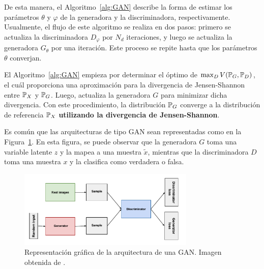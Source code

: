 {{De esta manera, el Algoritmo~\ref*{alg:GAN} describe la forma de estimar los parámetros $\theta$ y $\varphi$ de la generadora y la discriminadora, respectivamente. Usualmente, el flujo de este algoritmo se realiza en dos pasos: primero se actualiza la discriminadora $D_\varphi$ por $N_d$ iteraciones, y luego se actualiza la generadora $G_\theta$ por una iteración. Este proceso se repite hasta que los parámetros $\theta$ converjan.

\begin{remark}
    El Algoritmo~\ref{alg:GAN} empieza por determinar el óptimo de $\max_D V( \Prob_G , \Prob_D )$, el cuál proporciona una aproximación para la divergencia de Jensen-Shannon entre $\Prob_X$ y $\Prob_G$. Luego, actualiza la generadora $G$ para minimizar dicha divergencia. Con este procedimiento, la distribución $\Prob_G$ converge a la distribución de referencia $\Prob_X$ \textbf{utilizando la divergencia de Jensen-Shannon}.
\end{remark}

Es común que las arquitecturas de tipo GAN sean representadas como en la Figura~\ref{fig:gan-diagram}. En esta figura, se puede observar que la generadora $G$ toma una variable latente $z$ y la mapea a una muestra $\tilde x$, mientras que la discriminadora $D$ toma una muestra $x$ y la clasifica como verdadera o falsa.

\begin{figure}[thb!]
    \centering
    \includegraphics[width=0.75\textwidth]{img/gan/gan_diagram.pdf}
    \caption{Representación gráfica de la arquitectura de una GAN. Imagen obtenida de \cite{googlegan}.}
    \label{fig:gan-diagram}
\end{figure}











}}

